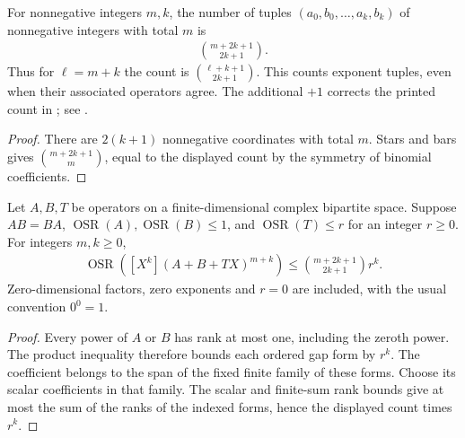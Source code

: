 \begin{theorem}
    \label{thm:polynomial_commuting_gap_count}
    \leanok
    For nonnegative integers $m,k$, the number of tuples
    $(a_0,b_0,\ldots,a_k,b_k)$ of nonnegative integers with total $m$ is
    \begin{align*}
        \binom{m+2k+1}{2k+1}.
    \end{align*}
    Thus for $\ell=m+k$ the count is $\binom{\ell+k+1}{2k+1}$.
    This counts exponent tuples, even when their associated operators agree.
    The additional $+1$ corrects the printed count in
    \cite[Lemma~4.2]{Arad2013AreaLaw}; see
    \cite{gap:aklv13_interpolation_and_word_count}.
\end{theorem}
\begin{proof}
    \leanok
    There are $2(k+1)$ nonnegative coordinates with total $m$.
    Stars and bars gives $\binom{m+2k+1}{m}$, equal to the displayed count
    by the symmetry of binomial coefficients.
\end{proof}


\begin{theorem}
    \label{thm:polynomial_commuting_gap_rank}
    \leanok
    Let $A,B,T$ be operators on a finite-dimensional complex bipartite space.
    Suppose $AB=BA$, $\operatorname{OSR}(A),\operatorname{OSR}(B)\le1$, and
    $\operatorname{OSR}(T)\le r$ for an integer $r\ge0$. For integers $m,k\ge0$,
    \begin{align*}
        \operatorname{OSR}\!\left([X^k](A+B+TX)^{m+k}\right)
            \le\binom{m+2k+1}{2k+1}r^k.
    \end{align*}
    Zero-dimensional factors, zero exponents and $r=0$ are included, with
    the usual convention $0^0=1$.
\end{theorem}
\begin{proof}
    \leanok
    Every power of $A$ or $B$ has rank at most one, including the zeroth
    power. The product inequality therefore bounds each ordered gap form by $r^k$.
    The coefficient belongs to the span of the fixed finite family of these
    forms. Choose its scalar coefficients in that family. The scalar and
    finite-sum rank bounds give at most the sum of the ranks of the indexed
    forms, hence the displayed count times $r^k$.
\end{proof}


